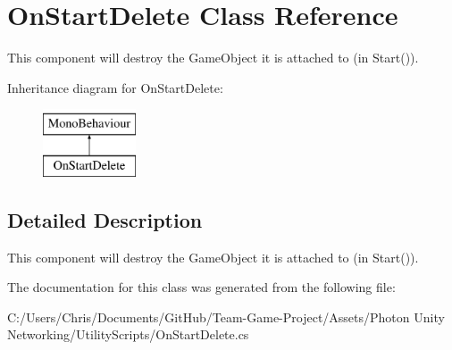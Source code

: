 \hypertarget{class_on_start_delete}{}\section{On\+Start\+Delete Class Reference}
\label{class_on_start_delete}


This component will destroy the Game\+Object it is attached to (in Start()). 


Inheritance diagram for On\+Start\+Delete\+:\begin{figure}[H]
\begin{center}
\leavevmode
\includegraphics[height=2.000000cm]{class_on_start_delete}
\end{center}
\end{figure}


\subsection{Detailed Description}
This component will destroy the Game\+Object it is attached to (in Start()).



The documentation for this class was generated from the following file\+:\begin{DoxyCompactItemize}
\item 
C\+:/\+Users/\+Chris/\+Documents/\+Git\+Hub/\+Team-\/\+Game-\/\+Project/\+Assets/\+Photon Unity Networking/\+Utility\+Scripts/On\+Start\+Delete.\+cs\end{DoxyCompactItemize}
